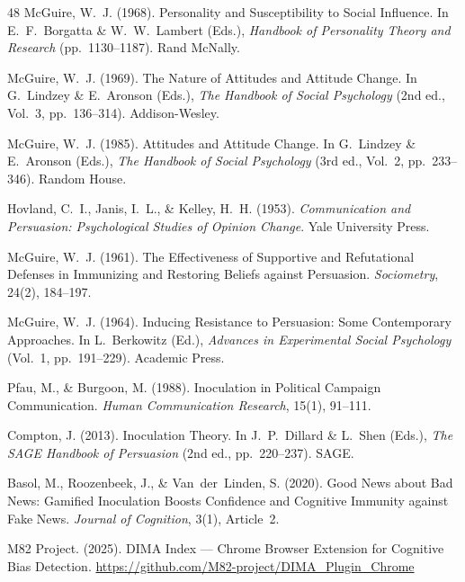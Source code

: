 \documentclass[11pt,a4paper]{article}
\begin{document}
\begin{thebibliography}{48}
McGuire, W.~J. (1968). Personality and Susceptibility to Social Influence. In E.~F.~Borgatta \& W.~W.~Lambert (Eds.), \textit{Handbook of Personality Theory and Research} (pp.~1130--1187). Rand McNally.

McGuire, W.~J. (1969). The Nature of Attitudes and Attitude Change. In G.~Lindzey \& E.~Aronson (Eds.), \textit{The Handbook of Social Psychology} (2nd ed., Vol.~3, pp.~136--314). Addison-Wesley.

McGuire, W.~J. (1985). Attitudes and Attitude Change. In G.~Lindzey \& E.~Aronson (Eds.), \textit{The Handbook of Social Psychology} (3rd ed., Vol.~2, pp.~233--346). Random House.

Hovland, C.~I., Janis, I.~L., \& Kelley, H.~H. (1953). \textit{Communication and Persuasion: Psychological Studies of Opinion Change}. Yale University Press.

McGuire, W.~J. (1961). The Effectiveness of Supportive and Refutational Defenses in Immunizing and Restoring Beliefs against Persuasion. \textit{Sociometry}, 24(2), 184--197.

McGuire, W.~J. (1964). Inducing Resistance to Persuasion: Some Contemporary Approaches. In L.~Berkowitz (Ed.), \textit{Advances in Experimental Social Psychology} (Vol.~1, pp.~191--229). Academic Press.

Pfau, M., \& Burgoon, M. (1988). Inoculation in Political Campaign Communication. \textit{Human Communication Research}, 15(1), 91--111.

Compton, J. (2013). Inoculation Theory. In J.~P.~Dillard \& L.~Shen (Eds.), \textit{The SAGE Handbook of Persuasion} (2nd ed., pp.~220--237). SAGE.

Basol, M., Roozenbeek, J., \& Van~der~Linden, S. (2020). Good News about Bad News: Gamified Inoculation Boosts Confidence and Cognitive Immunity against Fake News. \textit{Journal of Cognition}, 3(1), Article~2.

M82 Project. (2025). DIMA Index --- Chrome Browser Extension for Cognitive Bias Detection. \url{https://github.com/M82-project/DIMA_Plugin_Chrome}

\end{thebibliography}

\end{document}
